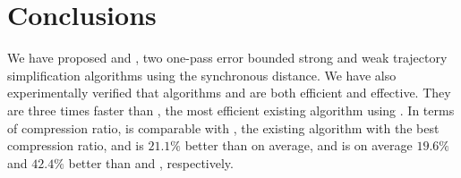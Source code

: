 \section{Conclusions} %
\label{sec-conclusion}

We have proposed \cist and \cista, two one-pass error bounded strong and weak trajectory simplification algorithms using the  synchronous distance.
We have also experimentally verified that algorithms \cist and \cista are both efficient and effective.
They are three times faster than \squishe, the most efficient existing \lsa algorithm using \sed.
In terms of compression ratio, \cist is {comparable} with \dps, the existing \lsa algorithm with the best compression ratio, and is $21.1\%$ better than \squishe on average, and \cista is on average $19.6\%$ and $42.4\%$ better than \dps and \squishe, respectively.
